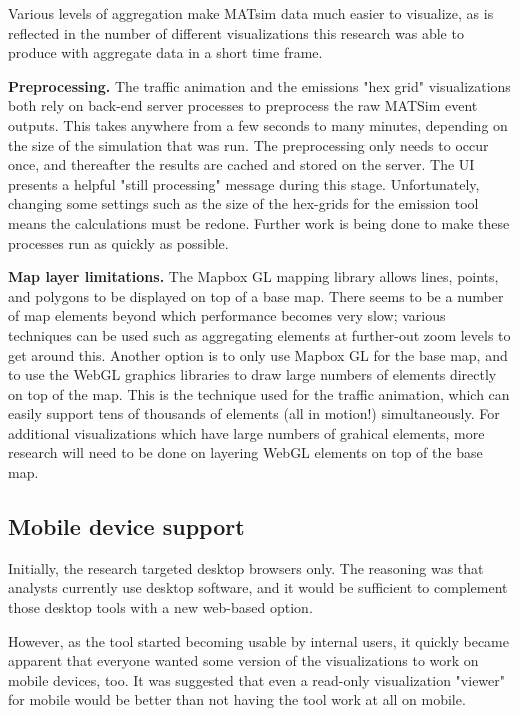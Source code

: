 \documentclass[Afour,sagev,times]{sagej}
\begin{document}
Various levels of aggregation make MATsim data much easier to visualize, as is reflected in the number of different visualizations this research was able to produce with aggregate data in a short time frame.

\textbf{Preprocessing.} The traffic animation and the emissions "hex grid" visualizations both rely on back-end server processes to preprocess the raw MATSim event outputs. This takes anywhere from a few seconds to many minutes, depending on the size of the simulation that was run. The preprocessing only needs to occur once, and thereafter the results are cached and stored on the server. The UI presents a helpful "still processing" message during this stage. Unfortunately, changing some settings such as the size of the hex-grids for the emission tool means the calculations must be redone. Further work is being done to make these processes run as quickly as possible.

\textbf{Map layer limitations.} The Mapbox GL mapping library allows lines, points, and polygons to be displayed on top of a base map. There seems to be a number of map elements beyond which performance becomes very slow; various techniques can be used such as aggregating elements at further-out zoom levels to get around this. Another option is to only use Mapbox GL for the base map, and to use the WebGL graphics libraries to draw large numbers of elements directly on top of the map. This is the technique used for the traffic animation, which can easily support tens of thousands of elements (all in motion!) simultaneously. For additional visualizations which have large numbers of grahical elements, more research will need to be done on layering WebGL elements on top of the base map.

\subsection{Mobile device support}

Initially, the research targeted desktop browsers only. The reasoning was that analysts currently use desktop software, and it would be sufficient to complement those desktop tools with a new web-based option.

However, as the tool started becoming usable by internal users, it quickly became apparent that everyone wanted some version of the visualizations to work on mobile devices, too. It was suggested that even a read-only visualization "viewer" for mobile would be better than not having the tool work at all on mobile.
\end{document}
